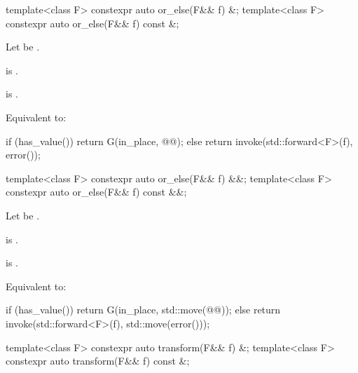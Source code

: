 %
\begin{itemdecl}
template<class F> constexpr auto or_else(F&& f) &;
template<class F> constexpr auto or_else(F&& f) const &;
\end{itemdecl}

\begin{itemdescr}
\pnum
Let  be .

\pnum
\constraints
{} is .

\pnum
\mandates
{} is .

\pnum
\effects
Equivalent to:
\begin{codeblock}
if (has_value())
  return G(in_place, @@);
else
  return invoke(std::forward<F>(f), error());
\end{codeblock}
\end{itemdescr}

%
\begin{itemdecl}
template<class F> constexpr auto or_else(F&& f) &&;
template<class F> constexpr auto or_else(F&& f) const &&;
\end{itemdecl}

\begin{itemdescr}
\pnum
Let  be
.

\pnum
\constraints
{} is .

\pnum
\mandates
{} is .

\pnum
\effects
Equivalent to:
\begin{codeblock}
if (has_value())
  return G(in_place, std::move(@@));
else
  return invoke(std::forward<F>(f), std::move(error()));
\end{codeblock}
\end{itemdescr}

%
\begin{itemdecl}
template<class F> constexpr auto transform(F&& f) &;
template<class F> constexpr auto transform(F&& f) const &;
\end{itemdecl}

